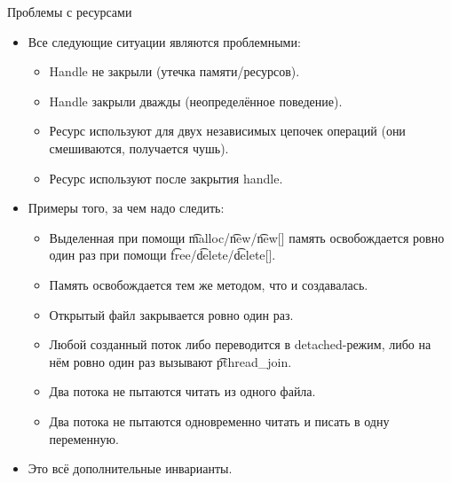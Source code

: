 \begin{frame}[t]{Проблемы с ресурсами}
	\begin{itemize}
		\item Все следующие ситуации являются проблемными:
			\begin{itemize}
				\item Handle не закрыли (утечка памяти/ресурсов).
				\item Handle закрыли дважды (неопределённое поведение).
				\item Ресурс используют для двух независимых цепочек операций (они смешиваются, получается чушь).
				\item Ресурс используют после закрытия handle.
			\end{itemize}
		\item Примеры того, за чем надо следить:
			\begin{itemize}
				\item
					Выделенная при помощи \t{malloc}/\t{new}/\t{new[]} память
					освобождается ровно один раз при помощи \t{free}/\t{delete}/\t{delete[]}.
				\item
					Память освобождается тем же методом, что и создавалась.
				\item
					Открытый файл закрывается ровно один раз.
				\item
					Любой созданный поток либо переводится в detached-режим, либо на нём ровно один раз вызывают \t{pthread\_join}.
				\item
					Два потока не пытаются читать из одного файла.
				\item
					Два потока не пытаются одновременно читать и писать в одну переменную.
			\end{itemize}
		\item Это всё дополнительные инварианты.
	\end{itemize}
\end{frame}

